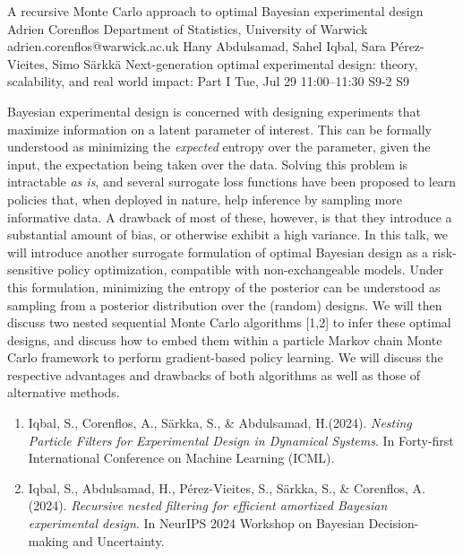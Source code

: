 \begin{talk}
  {A recursive Monte Carlo approach to optimal Bayesian experimental design}%
  {Adrien Corenflos}%
  {Department of Statistics, University of Warwick}%
  {adrien.corenflos@warwick.ac.uk}%
  {Hany Abdulsamad, Sahel Iqbal, Sara P\'erez-Vieites, Simo S\"arkk\"a}%
  {Next-generation optimal experimental design: theory, scalability, and real world impact: Part I}%
  {Tue, Jul 29 11:00--11:30}%
  {S9-2}%
  {S9}%
    
   
    Bayesian experimental design is concerned with designing experiments that maximize information on a latent parameter of interest. 
    This can be formally understood as minimizing the \emph{expected} entropy over the parameter, given the input, the expectation being taken over the data.
    Solving this problem is intractable \emph{as is}, and several surrogate loss functions have been proposed to learn policies that, when deployed in nature, help inference by sampling more informative data.
    A drawback of most of these, however, is that they introduce a substantial amount of bias, or otherwise exhibit a high variance.
    In this talk, we will introduce another surrogate formulation of optimal Bayesian design as a risk-sensitive policy optimization, compatible with non-exchangeable models.
    Under this formulation, minimizing the entropy of the posterior can be understood as sampling from a posterior distribution over the (random) designs.
    We will then discuss two nested sequential Monte Carlo algorithms [1,2] to infer these optimal designs, and discuss how to embed them within a particle Markov chain Monte Carlo framework to perform gradient-based policy learning. 
    We will discuss the respective advantages and drawbacks of both algorithms as well as those of alternative methods.
\medskip


\begin{enumerate}
 \item[{[1]}]Iqbal, S., Corenflos, A., S\"arkka, S., \&  Abdulsamad, H.(2024). {\it Nesting Particle Filters for Experimental Design in Dynamical Systems}. In Forty-first International Conference on Machine Learning (ICML).
 \item[{[2]}] Iqbal, S., Abdulsamad, H., P\'erez-Vieites, S., S\"arkka, S., \& Corenflos, A. (2024). {\it Recursive nested filtering for efficient amortized Bayesian experimental design}. In NeurIPS 2024 Workshop on Bayesian Decision-making and Uncertainty.
\end{enumerate}

\end{talk}

